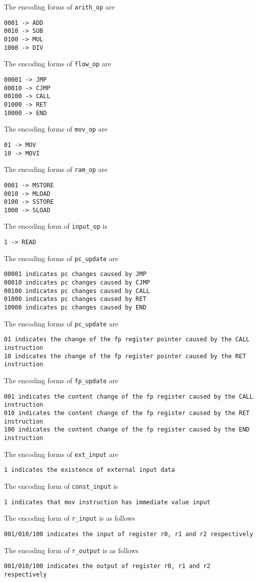 \noindent
The encoding forms of \verb|arith_op| are
\begin{lstlisting}
0001 -> ADD
0010 -> SUB
0100 -> MUL
1000 -> DIV
\end{lstlisting}
The encoding forms of \verb|flow_op| are
\begin{lstlisting}
00001 -> JMP
00010 -> CJMP
00100 -> CALL
01000 -> RET
10000 -> END
\end{lstlisting}
The encoding forms of \verb|mov_op| are
\begin{lstlisting}
01 -> MOV
10 -> MOVI
\end{lstlisting}
The encoding forms of \verb|ram_op| are
\begin{lstlisting}
0001 -> MSTORE
0010 -> MLOAD
0100 -> SSTORE
1000 -> SLOAD
\end{lstlisting}
The encoding form of \verb|input_op| is
\begin{lstlisting}
1 -> READ
\end{lstlisting}
The encoding forms of \verb|pc_update| are
\begin{lstlisting}
00001 indicates pc changes caused by JMP
00010 indicates pc changes caused by CJMP
00100 indicates pc changes caused by CALL
01000 indicates pc changes caused by RET
10000 indicates pc changes caused by END
\end{lstlisting}
The encoding forms of \verb|pc_update| are
\begin{lstlisting}
01 indicates the change of the fp register pointer caused by the CALL instruction
10 indicates the change of the fp register pointer caused by the RET instruction
\end{lstlisting}
The encoding forms of \verb|fp_update| are
\begin{lstlisting}
001 indicates the content change of the fp register caused by the CALL instruction
010 indicates the content change of the fp register caused by the RET instruction
100 indicates the content change of the fp register caused by the END instruction
\end{lstlisting}
The encoding forms of \verb|ext_input| are
\begin{lstlisting}
1 indicates the existence of external input data
\end{lstlisting}
The encoding form of \verb|const_input| is
\begin{lstlisting}
1 indicates that mov instruction has immediate value input
\end{lstlisting}
The encoding form of \verb|r_input| is as follows
\begin{lstlisting}
001/010/100 indicates the input of register r0, r1 and r2 respectively
\end{lstlisting}
The encoding form of \verb|r_output| is as follows
\begin{lstlisting}
001/010/100 indicates the output of register r0, r1 and r2 respectively
\end{lstlisting}

